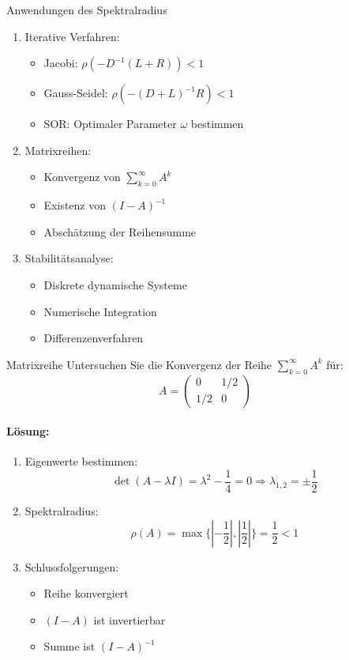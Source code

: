 \begin{KR}{Anwendungen des Spektralradius}
\begin{enumerate}
    \item Iterative Verfahren:
    \begin{itemize}
        \item Jacobi: $\rho(-D^{-1}(L+R)) < 1$
        \item Gauss-Seidel: $\rho(-(D+L)^{-1}R) < 1$
        \item SOR: Optimaler Parameter $\omega$ bestimmen
    \end{itemize}
    
    \item Matrixreihen:
    \begin{itemize}
        \item Konvergenz von $\sum_{k=0}^\infty A^k$
        \item Existenz von $(I-A)^{-1}$
        \item Abschätzung der Reihensumme
    \end{itemize}
    
    \item Stabilitätsanalyse:
    \begin{itemize}
        \item Diskrete dynamische Systeme
        \item Numerische Integration
        \item Differenzenverfahren
    \end{itemize}
\end{enumerate}
\end{KR}

\begin{example2}{Matrixreihe}
Untersuchen Sie die Konvergenz der Reihe $\sum_{k=0}^\infty A^k$ für:
$$A = \begin{pmatrix}
0 & 1/2 \\
1/2 & 0
\end{pmatrix}$$

\paragraph{Lösung:}
\begin{enumerate}
    \item Eigenwerte bestimmen:
    $$\det(A-\lambda I) = \lambda^2 - \frac{1}{4} = 0 \Rightarrow \lambda_{1,2} = \pm\frac{1}{2}$$
    
    \item Spektralradius:
    $$\rho(A) = \max\{|-\frac{1}{2}|, |\frac{1}{2}|\} = \frac{1}{2} < 1$$
    
    \item Schlussfolgerungen:
    \begin{itemize}
        \item Reihe konvergiert
        \item $(I-A)$ ist invertierbar
        \item Summe ist $(I-A)^{-1}$
    \end{itemize}
\end{enumerate}
\end{example2}





